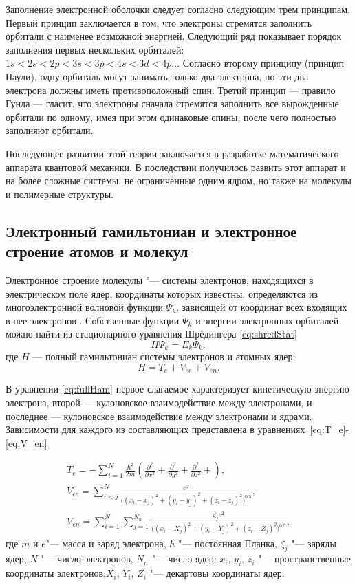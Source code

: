 Заполнение электронной оболочки следует согласно следующим трем принципам. 
Первый принцип заключается в том, что электроны стремятся заполнить орбитали с наименее возможной энергией. 
Следующий ряд показывает порядок заполнения первых нескольких орбиталей: $1s<2s<2p<3s<3p<4s<3d<4p...$ Согласно второму принципу (принцип Паули), одну орбиталь могут занимать только два электрона, но эти два электрона должны иметь противоположный спин. 
Третий принцип --- правило Гунда --- гласит, что электроны сначала стремятся заполнить все вырожденные орбитали по одному, имея при этом одинаковые спины, после чего полностью заполняют орбитали.

Последующее развитии этой теории заключается в разработке математического аппарата квантовой механики. 
В последствии получилось развить этот аппарат и на более сложные системы, не ограниченные одним ядром, но также на молекулы и полимерные структуры.

\subsection{Электронный гамильтониан и электронное строение атомов и молекул}

Электронное строение молекулы "--- системы электронов, находящихся в электрическом поле ядер, координаты которых известны, определяются из многоэлектронной волновой функции $\Psi_k$, зависящей от координат всех входящих в нее электронов \cite{landau1974,davidov1973,sleiter1969}. 
Собственные функции $\Psi_k$ и энергии электронных орбиталей можно найти из стационарного уравнения Шрёдингера \ref{eq:shredStat}
\begin{equation}
\label{eq:shredStat}
H\Psi_k=E_k\Psi_k,
\end{equation}
где $H$ --- полный гамильтониан системы электронов и атомных ядер;
\begin{equation}
\label{eq:fullHam}
H=T_e+V_{ee}+V_{en}.
\end{equation}

В уравнении \ref{eq:fullHam} первое слагаемое характеризует кинетическую энергию электрона, второй --- кулоновское взаимодействие между электронами, и последнее --- кулоновское взаимодействие между электронами и ядрами. 
Зависимости для каждого из составляющих представлена в уравнениях~\ref{eq:T_e}-\ref{eq:V_en}

\begin{eqnarray}
\label{eq:T_e}
T_e=-\sum_{i=1}^{N}\frac{\hbar^2}{2m}\left(\frac{\partial^2}{\partial x^2}+\frac{\partial^2}{\partial y^2}+\frac{\partial^2}{\partial z^2}+\right), \\
\label{eq:V_ee}
V_{ee}=\sum_{i<j}^{N}\frac{e^{2}}{\biggl((x_i-x_j)^2+(y_i-y_j)^2+(z_i-z_j)^2\biggr)^{0.5}}, \\
\label{eq:V_en}
V_{en}=\sum_{i=1}^{N}\sum_{j=1}^{N_n}\frac{\zeta_j e^{2}}{\biggl((x_i-X_j)^2+(y_i-Y_j)^2+(z_i-Z_j)^2\biggr)^{0.5}},
\end{eqnarray}
где $m$ и $e$"--- масса и заряд электрона, $\hbar$ "--- постоянная Планка, $\zeta_j$ "--- заряды ядер, $N$ "--- число электронов, $N_n$ "--- число ядер; $x_i$, $y_i$, $z_i$ "--- пространственные координаты электронов;$X_i$, $Y_i$, $Z_i$ "--- декартовы координаты ядер.

